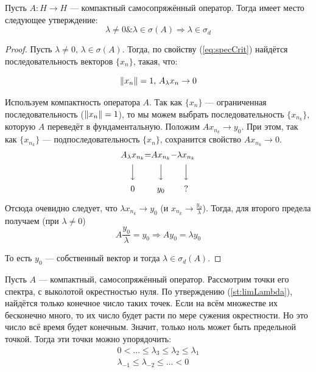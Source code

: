 \documentclass[12pt]{article}
\begin{document}
			\begin{theorem}
				Пусть $A: H \rightarrow H$ --- компактный самосопряжённый оператор. Тогда имеет место следующее утверждение:
				$$\lambda \neq 0 \& \lambda \in \sigma(A) \Rightarrow \lambda \in \sigma_d $$
			\end{theorem}
			\begin{proof}
				Пусть $\lambda \neq 0,\, \lambda \in \sigma(A)$. Тогда, по свойству (\ref{eq:specCrit}) найдётся последовательность 
				векторов $\{x_n\}$, такая, что:
		
				$$\left\| x_n \right\| = 1,\, A_{\lambda}x_n \rightarrow 0$$
		
				Используем компактность оператора $A$. Так как $\{x_n\}$ --- ограниченная последовательность ($\left\| x_n \right\| = 1$), то
				мы можем выбрать последовательность $\{x_{n_k}\}$, которую $A$ переведёт в фундаментальную. 
				Положим $Ax_{n_k}\rightarrow y_0$. При этом, так как $\{x_{n_k}\}$ --- подпоследовательность $\{x_{n}\}$, 
				сохранится свойство $Ax_{n_k} \rightarrow 0$.
				$$
				\begin{CD}
					A_{\lambda}x_{n_k} @.=@. Ax_{n_k} @.-@. \lambda x_{n_k} \\
					@VVV @. @VVV @. @VVV \\
					0 @.@. y_0 @.@. ?
				\end{CD}
				$$
		
				Отсюда очевидно следует, что $\lambda x_{n_k} \rightarrow y_0$ (и $x_{n_k} \rightarrow \frac{y_0}{\lambda}$). Тогда, для второго предела получаем (при $\lambda \neq 0$)
				$$A\dfrac{y_0}{\lambda} = y_0 \Rightarrow Ay_0 = \lambda y_0$$
		
				То есть $y_0$ --- собственный вектор и тогда $\lambda \in \sigma_d(A)$.
			\end{proof}
	
			Пусть $A$ --- компактный, самосопряжённый оператор. Рассмотрим точки его спектра, с выколотой окрестностью нуля. 
			По утверждению (\ref{st:limLambda}), найдётся только конечное число таких точек. Если на всём множестве их бесконечно много, 
			то их число будет расти по мере сужения окрестности. Но это число всё время будет конечным. Значит, только ноль может быть
			предельной точкой. Тогда эти точки можно упорядочить:
			\begin{gather*}
				0 < \dots \leq \lambda_3 \leq \lambda_2 \leq \lambda_1 \\
				\lambda_{-1} \leq \lambda_{-2} \leq \dots < 0
			\end{gather*}
	
\end{document}
